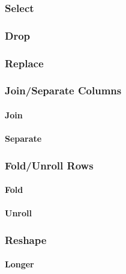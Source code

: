 \documentclass[]{article}
\let\oldparagraph\paragraph
\renewcommand{\paragraph}[1]{\oldparagraph{#1}\mbox{}}
\begin{document}
\subsubsection{Select}\label{select-2}

\subsubsection{Drop}\label{drop-2}

\subsubsection{Replace}\label{replace}

\subsubsection{Join/Separate Columns}\label{joinseparate-columns}

\paragraph{Join}\label{join}

\paragraph{Separate}\label{separate}

\subsubsection{Fold/Unroll Rows}\label{foldunroll-rows}

\paragraph{Fold}\label{fold}

\paragraph{Unroll}\label{unroll}

\subsubsection{Reshape}\label{reshape}

\paragraph{Longer}\label{longer}
\end{document}
